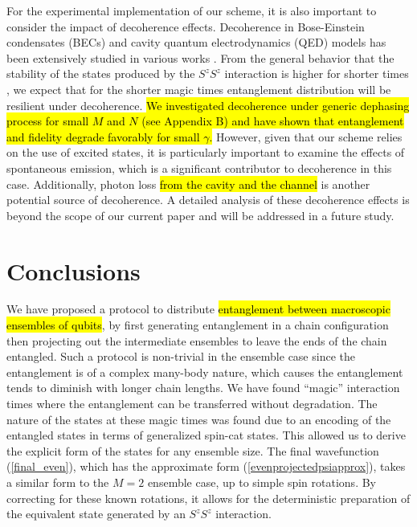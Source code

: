 \documentclass[%
  prx,%
  twocolumn,%
  preprintnumbers,%
  amsmath,%
  amssymb,%
  superscriptaddress%
]{revtex4}
\begin{document}
{For the experimental implementation of our scheme, it is also important to consider the impact of decoherence effects. Decoherence in Bose-Einstein condensates (BECs) and cavity quantum electrodynamics (QED) models has been extensively studied in various works \cite{Anglin1997,Burt1997,Dalvit2000,Ferrini2011,Li2008,Li2009,Pellizzari1995,Putz2014,Sinatra1998,Schlosshauer2019}. From the general behavior that the stability of the states produced by the $ S^z S^z $ interaction is higher for shorter times \cite{byrnes2013fractality}, we expect that for the shorter magic times entanglement distribution will be resilient under decoherence. \hl{We investigated decoherence under generic dephasing process for small $M$ and $N$ (see Appendix B) and have shown that entanglement and fidelity degrade favorably for small $\gamma$.} However, given that our scheme relies on the use of excited states, it is particularly important to examine the effects of spontaneous emission, which is a significant contributor to decoherence in this case. Additionally, photon loss \hl{from the cavity and the channel} is another potential source of decoherence. A detailed analysis of these decoherence effects is beyond the scope of our current paper and will be addressed in a future study.




\section{Conclusions}

We have proposed a protocol to distribute \hl{entanglement between macroscopic ensembles of qubits}, by first generating entanglement in a chain configuration then projecting out the intermediate ensembles to leave the ends of the chain entangled.  Such a protocol is non-trivial in the ensemble case since the entanglement is of a complex many-body nature, which causes the entanglement tends to diminish with longer chain lengths.  We have found ``magic'' interaction times where the entanglement can be transferred without degradation.  The nature of the states at these magic times was found due to an encoding of the entangled states in terms of generalized spin-cat states.  This allowed us to derive the explicit form of the states for any ensemble size. The final wavefunction (\ref{final_even}), which has the approximate form (\ref{evenprojectedpsiapprox}), takes a similar form to the $ M = 2 $ ensemble case, up to simple spin rotations.  By correcting for these known rotations, it allows for the deterministic preparation of the equivalent state generated by an $ S^z S^z $ interaction.

}
\end{document}
